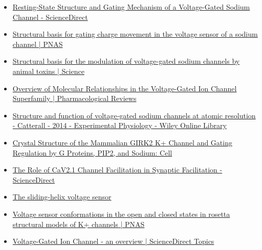 \documentclass[letterpaper]{article}
\begin{document}
\begin{itemize}
\item \href{https://www.sciencedirect.com/science/article/pii/S0092867419307342}{Resting-State Structure and Gating Mechanism of a Voltage-Gated Sodium Channel - ScienceDirect}
\item \href{https://www.pnas.org/content/109/2/E93}{Structural basis for gating charge movement in the voltage sensor of a sodium channel | PNAS}
\item \href{https://science.sciencemag.org/content/362/6412/eaau2596?rss\%253D1=}{Structural basis for the modulation of voltage-gated sodium channels by animal toxins | Science}
\item \href{https://pharmrev.aspetjournals.org/content/57/4/387.full}{Overview of Molecular Relationships in the Voltage-Gated Ion Channel Superfamily | Pharmacological Reviews}
\item \href{https://physoc.onlinelibrary.wiley.com/doi/10.1113/expphysiol.2013.071969}{Structure and function of voltage‐gated sodium channels at atomic resolution - Catterall - 2014 - Experimental Physiology - Wiley Online Library}
\item \href{https://www.cell.com/cell/fulltext/S0092-8674(11)00997-4?\_returnURL=https\%3A\%2F\%2Flinkinghub.elsevier.com\%2Fretrieve\%2Fpii\%2FS0092867411009974\%3Fshowall\%3Dtrue}{Crystal Structure of the Mammalian GIRK2 K+ Channel and Gating Regulation by G Proteins, PIP2, and Sodium: Cell}
\item \href{https://www.sciencedirect.com/science/article/pii/S2211124719301512}{The Role of CaV2.1 Channel Facilitation in Synaptic Facilitation - ScienceDirect}
\item \href{https://www.ncbi.nlm.nih.gov/pmc/articles/PMC3448954/}{The sliding-helix voltage sensor}
\item \href{https://www.pnas.org/content/103/19/7292}{Voltage sensor conformations in the open and closed states in rosetta structural models of K+ channels | PNAS}
\item \href{https://www.sciencedirect.com/topics/biochemistry-genetics-and-molecular-biology/voltage-gated-ion-channel\#:\~:text=Voltage\%2Dgated ion channels contain,domain responsible for sensing voltage.}{Voltage-Gated Ion Channel - an overview | ScienceDirect Topics}
\end{itemize}
\end{document}
